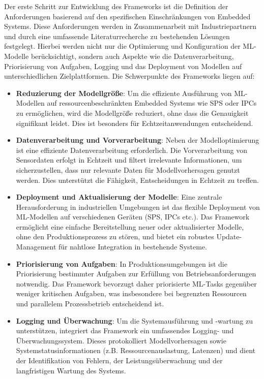 Der erste Schritt zur Entwicklung des Frameworks ist die Definition der Anforderungen basierend auf den spezifischen Einschränkungen von Embedded Systems. 
Diese Anforderungen werden in Zusammenarbeit mit Industriepartnern und durch eine umfassende Literaturrecherche zu bestehenden Lösungen festgelegt. Hierbei werden nicht 
nur die Optimierung und Konfiguration der ML-Modelle berücksichtigt, sondern auch Aspekte wie die Datenverarbeitung, Priorisierung von Aufgaben, Logging und das Deployment 
von Modellen auf unterschiedlichen Zielplattformen. Die Schwerpunkte des Frameworks liegen auf:
\begin{itemize}
    \item \textbf{Reduzierung der Modellgröße}: Um die effiziente Ausführung von ML-Modellen auf ressourcenbeschränkten Embedded Systems wie SPS oder IPCs zu ermöglichen, 
    wird die Modellgröße reduziert, ohne dass die Genauigkeit signifikant leidet. Dies ist besonders für Echtzeitanwendungen entscheidend.   
    \item \textbf{Datenverarbeitung und Vorverarbeitung}: Neben der Modelloptimierung ist eine effiziente Datenverarbeitung erforderlich. Die Vorverarbeitung von Sensordaten 
    erfolgt in Echtzeit und filtert irrelevante Informationen, um sicherzustellen, dass nur relevante Daten für Modellvorhersagen genutzt werden. Dies unterstützt die Fähigkeit, 
    Entscheidungen in Echtzeit zu treffen.
   
    \item \textbf{Deployment und Aktualisierung der Modelle}: Eine zentrale Herausforderung in industriellen Umgebungen ist das flexible Deployment von ML-Modellen auf 
    verschiedenen Geräten (SPS, IPCs etc.). Das Framework ermöglicht eine einfache Bereitstellung neuer oder aktualisierter Modelle, ohne den Produktionsprozess zu stören, 
    und bietet ein robustes Update-Management für nahtlose Integration in bestehende Systeme.
  
    \item \textbf{Priorisierung von Aufgaben}: In Produktionsumgebungen ist die Priorisierung bestimmter Aufgaben zur Erfüllung von Betriebsanforderungen notwendig. 
    Das Framework bevorzugt daher priorisierte ML-Tasks gegenüber weniger kritischen Aufgaben, was insbesondere bei begrenzten Ressourcen und parallelem Prozessbetrieb entscheidend ist.
   
    \item \textbf{Logging und Überwachung}: Um die Systemausführung und -wartung zu unterstützen, integriert das Framework ein umfassendes Logging- und Überwachungssystem. 
    Dieses protokolliert Modellvorhersagen sowie Systemstatusinformationen (z.B. Ressourcenauslastung, Latenzen) und dient der Identifikation von Fehlern, der 
    Leistungsüberwachung und der langfristigen Wartung des Systems.
  

\end{itemize}
